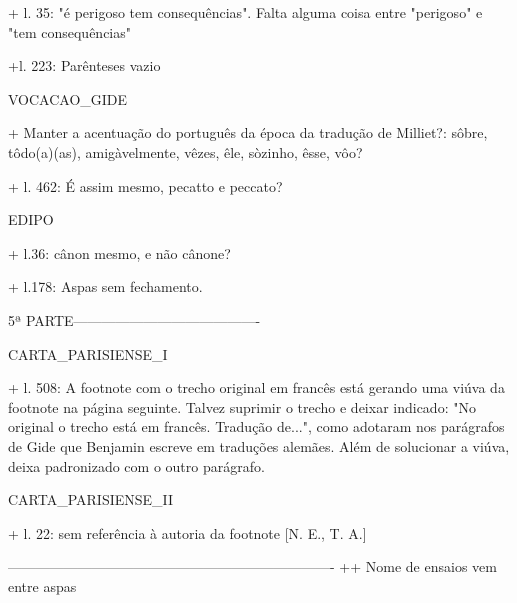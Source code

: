 + l. 35: "é perigoso tem consequências". Falta alguma coisa entre "perigoso" e "tem consequências"

+l. 223: Parênteses vazio

VOCACAO_GIDE

+ Manter a acentuação do português da época da tradução de Milliet?: sôbre, tôdo(a)(as), amigàvelmente, vêzes, êle, sòzinho, êsse, vôo?

+ l. 462: É assim mesmo, pecatto e peccato?

EDIPO

+ l.36: cânon mesmo, e não cânone?

+ l.178: Aspas sem fechamento.


5ª PARTE----------------------------------------

CARTA_PARISIENSE_I

+ l. 508: A footnote com o trecho original em francês está gerando uma viúva da footnote na página seguinte. Talvez suprimir o trecho e deixar indicado: "No original o trecho está em francês. Tradução de...", como adotaram nos parágrafos de Gide que Benjamin escreve em traduções alemães. Além de solucionar a viúva, deixa padronizado com o outro parágrafo.


CARTA_PARISIENSE_II

+ l. 22: sem referência à autoria da footnote [N. E., T. A.]



----------------------------------------------------------------------
++ Nome de ensaios vem entre aspas